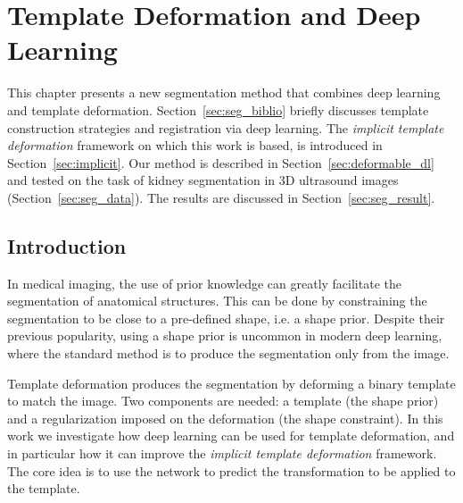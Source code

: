 \chapter{Template Deformation and Deep Learning}
\label{chap:seg}

\begin{chapabstract}
This chapter presents a new segmentation method that combines deep learning and template deformation.  Section~\ref{sec:seg_biblio} briefly discusses template construction strategies and registration via deep learning. The \textit{implicit template deformation} framework on which this work is based, is introduced in Section~\ref{sec:implicit}. Our method is described in Section~\ref{sec:deformable_dl} and tested on the task of kidney segmentation in 3D ultrasound images (Section~\ref{sec:seg_data}). The results are discussed in Section~\ref{sec:seg_result}.
\end{chapabstract}

\vspace{1cm}

{   
    \minitoc
}

\newpage

\section{Introduction}

In medical imaging, the use of prior knowledge can greatly facilitate the segmentation of anatomical structures. This can be done by constraining the segmentation to be close to a pre-defined shape, i.e. a shape prior. Despite their previous popularity, using a shape prior is uncommon in modern deep learning, where the standard method is to produce the segmentation only from the image. 

Template deformation produces the segmentation by deforming a binary template to match the image. Two components are needed: a template (the shape prior) and a regularization imposed on the deformation (the shape constraint). In this work we investigate how deep learning can be used for template deformation, and in particular how it can improve the \textit{implicit template deformation} framework. The core idea is to use the network to predict the transformation to be applied to the template.

